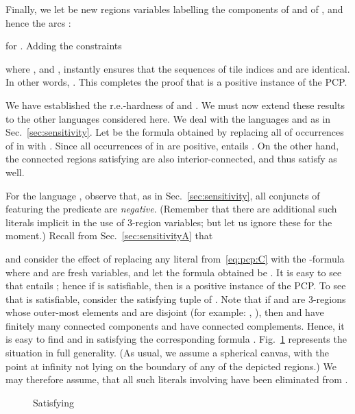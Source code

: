 \documentclass{article}
\begin{document}
Finally, we let  be
new regions variables labelling the components of  and of ,
and hence the arcs :

for . Adding the constraints

where ,  and , instantly ensures that the sequences of tile indices  and  are identical. In other words,
.  This completes the proof that  is a positive
instance of the PCP.

We have established the r.e.-hardness of  and
. We must now extend these results to the
other languages considered here. We deal with the languages 
and  as in Sec.~\ref{sec:sensitivity}. Let  be
the  formula obtained by replacing all of occurrences of 
in  with . Since all occurrences of  in 
are positive,  entails . On the other
hand, the connected regions satisfying  are also
interior-connected, and thus satisfy  as well.

For the language , observe that, as in Sec.~\ref{sec:sensitivity},  
all conjuncts of  featuring the predicate  are {\em negative}. 
(Remember that there are additional such literals
implicit in the use of 3-region variables; but let us ignore these for
the moment.) Recall from Sec.~\ref{sec:sensitivityA} that

and consider the effect of replacing any literal 
from~\eqref{eq:pcp:C} with the -formula  where  and  are fresh variables, and let
the formula obtained be . It is easy to see that  entails
; hence if  is satisfiable, then  is a positive
instance of the PCP.  To see that  is satisfiable, consider the
satisfying tuple of . Note that if  and 
are 3-regions whose outer-most elements  and  are disjoint (for
example: , ),
then  and  have finitely many connected components and have
connected complements. Hence, it is easy to find  and  in
 satisfying the corresponding formula .  Fig.~\ref{fig:connectingRsAndSs} represents the
situation in full generality. (As usual, we assume a spherical
canvas, with the point at infinity not lying on the
boundary of any of the depicted regions.)  We may therefore assume,
that all such literals involving  have been eliminated from
.

\begin{figure}[h]
	\begin{center}
	\end{center}
	\caption{Satisfying }
	\label{fig:connectingRsAndSs}
\end{figure}
\end{document}
